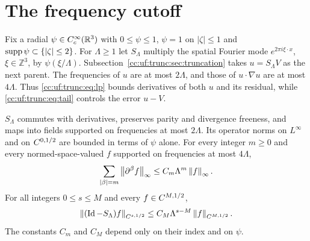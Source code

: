 \section{The frequency cutoff}\label{cc:app:cutoff}
Fix a radial $\psi\in C_c^\infty(\mathbb R^3)$ with $0\le\psi\le1$, $\psi=1$ on
$|\zeta|\le1$ and $\operatorname{supp}\psi\subset\{|\zeta|\le2\}$. For $\Lambda\ge1$ let
$S_\Lambda$ multiply the spatial Fourier mode $e^{2\pi i\xi\cdot x}$,
$\xi\in\mathbb Z^3$, by $\psi(\xi/\Lambda)$.
Subsection~\ref{cc:uf:trunc:sec:truncation} takes $u=S_\Lambda V$ as the
next parent. The frequencies of $u$ are at most $2\Lambda$, and those of
$u\cdot\nabla u$ are at most $4\Lambda$. Thus \eqref{cc:uf:trunc:eq:lp}
bounds derivatives of both $u$ and its residual, while
\eqref{cc:uf:trunc:eq:tail} controls the error $u-V$.

\begin{lemma}\label{cc:uf:trunc:lem:cutoff}
$S_\Lambda$ commutes with derivatives, preserves parity and divergence
freeness, and maps into fields supported on frequencies at most
$2\Lambda$. Its operator norms on $L^\infty$ and on $C^{0,1/2}$ are bounded
in terms of $\psi$ alone. For every integer $m\ge0$ and every
normed-space-valued $f$ supported on frequencies at most $4\Lambda$,
\begin{equation}\label{cc:uf:trunc:eq:lp}
 \sum_{|\beta|=m}\left\lVert\partial^\beta f\right\rVert_\infty\le C_m\Lambda^m\left\lVert f\right\rVert_\infty .
\end{equation}
For all integers $0\le s\le M$ and every $f\in C^{M,1/2}$,
\begin{equation}\label{cc:uf:trunc:eq:tail}
 \left\lVert(\operatorname{Id}-S_\Lambda)f\right\rVert_{C^{s,1/2}}
 \le C_M\Lambda^{s-M}\left\lVert f\right\rVert_{C^{M,1/2}}.
\end{equation}
The constants $C_m$ and $C_M$ depend only on their index and on $\psi$.
\end{lemma}

